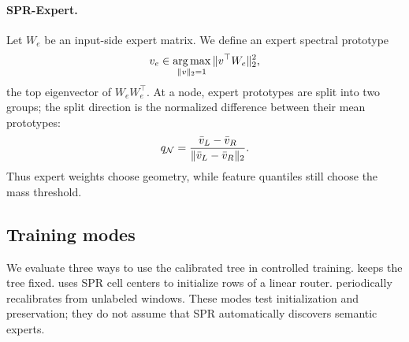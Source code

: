 \paragraph{SPR-Expert.}
Let $W_e$ be an input-side expert matrix.  We define an expert spectral
prototype
\begin{equation}
  v_e\in\operatorname*{arg\,max}_{\|v\|_2=1}\|v^{\top}W_e\|_2^2 ,
\end{equation}
the top eigenvector of $W_eW_e^\top$.  At a node, expert prototypes are split
into two groups; the split direction is the normalized difference between their
mean prototypes:
\begin{equation}
  q_{\mathcal{N}}=
  \frac{\bar v_L-\bar v_R}{\|\bar v_L-\bar v_R\|_2}.
\end{equation}
Thus expert weights choose geometry, while feature quantiles still choose the
mass threshold.

\subsection{Training modes}

We evaluate three ways to use the calibrated tree in controlled training.
 keeps the tree fixed.   uses SPR
cell centers to initialize rows of a linear router.  
periodically recalibrates from unlabeled windows.  These modes test
initialization and preservation; they do not assume that SPR automatically
discovers semantic experts.
